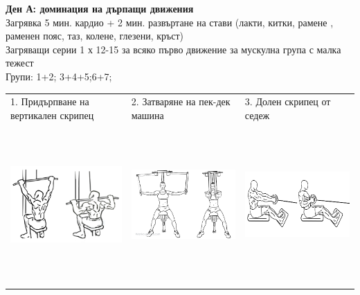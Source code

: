 \documentclass{article}
\begin{document}
\centering
\textbf{Ден А: доминация на дърпащи движения}\\
Загрявка 5 мин. кардио + 2 мин. развъртане на стави (лакти, китки, рамене ,
раменен пояс, таз, колене, глезени, кръст)\\
Загряващи серии 1 х 12-15 за всяко първо движение за мускулна група с малка
тежест\\
Групи: 1+2; 3+4+5;6+7;\\ 
\begin{tabular}{ | m{5cm} | m{5cm} | m{5cm} | }
\hline
1. Придърпване на вертикален скрипец & 2. Затваряне на пек-дек машина & 3. Долен скрипец от седеж\\ 
\begin{minipage}{5cm} \includegraphics[width=\linewidth, height=60mm]{day_A_ex_1_Wide_grip_lat_pull_down_2-1024x704.png}\end{minipage}&
\begin{minipage}{5cm} \includegraphics[width=\linewidth, height=60mm]{day_A_ex_2_Butterfly_F_WorkoutLabs.png} \end{minipage}& 
\begin{minipage}{5cm} \includegraphics[width=\linewidth, height=60mm]{day_A_ex_3_nab_seated_cable_row.jpg} \end{minipage}\\ 

\end{tabular}
\end{document}
